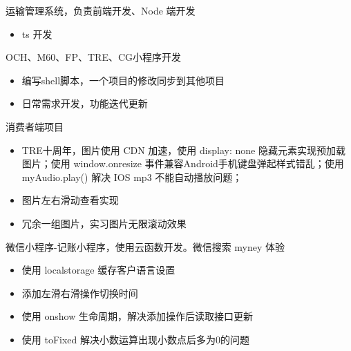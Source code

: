 \documentclass{resume}
\begin{document}
\begin{onehalfspacing}
运输管理系统，负责前端开发、Node 端开发
\begin{itemize}
  \item ts 开发
\end{itemize}
\end{onehalfspacing}

\begin{onehalfspacing}
OCH、M60、FP、TRE、CG小程序开发
\begin{itemize}
  \item 编写shell脚本，一个项目的修改同步到其他项目
  \item 日常需求开发，功能迭代更新
\end{itemize}
\end{onehalfspacing}

\newpage

\begin{onehalfspacing}
消费者端项目
\begin{itemize}
  \item TRE十周年，图片使用 CDN 加速，使用 display: none 隐藏元素实现预加载图片；使用 window.onresize 事件兼容Android手机键盘弹起样式错乱；使用 myAudio.play() 解决 IOS mp3 不能自动播放问题；
  \item 图片左右滑动查看实现
  \item 冗余一组图片，实习图片无限滚动效果
\end{itemize}
\end{onehalfspacing}

\begin{onehalfspacing}
微信小程序-记账小程序，使用云函数开发。微信搜索 myney 体验
\begin{itemize}
  \item 使用 localstorage 缓存客户语言设置
  \item 添加左滑右滑操作切换时间
  \item 使用 onshow 生命周期，解决添加操作后读取接口更新
  \item 使用 toFixed 解决小数运算出现小数点后多为0的问题
\end{itemize}
\end{onehalfspacing}
\end{document}
